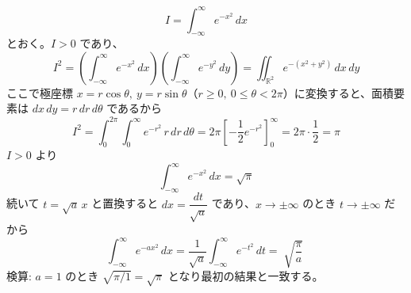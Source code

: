 
\[
I = \int_{-\infty}^{\infty} e^{-x^{2}}\, dx
\]
とおく。$I > 0$ であり、
\[
I^{2} = \left(\int_{-\infty}^{\infty} e^{-x^{2}}\, dx\right)\left(\int_{-\infty}^{\infty} e^{-y^{2}}\, dy\right)
= \iint_{\mathbb{R}^{2}} e^{-(x^{2}+y^{2})}\, dx\, dy
\]
ここで極座標 $x = r\cos\theta,\ y = r\sin\theta$（$r \ge 0,\ 0 \le \theta < 2\pi$）に変換すると、面積要素は $dx\,dy = r\, dr\, d\theta$ であるから
\[
I^{2} = \int_{0}^{2\pi}\!\! \int_{0}^{\infty} e^{-r^{2}}\, r\, dr\, d\theta
= 2\pi\left[-\frac{1}{2}e^{-r^{2}}\right]_{0}^{\infty}
= 2\pi \cdot \frac{1}{2} = \pi
\]
$I > 0$ より
\[
\boxed{\; \int_{-\infty}^{\infty} e^{-x^{2}}\, dx = \sqrt{\pi} \;}
\]
続いて $t = \sqrt{a}\, x$ と置換すると $dx = \dfrac{dt}{\sqrt{a}}$ であり、$x \to \pm\infty$ のとき $t \to \pm\infty$ だから
\[
\int_{-\infty}^{\infty} e^{-a x^{2}}\, dx = \frac{1}{\sqrt{a}} \int_{-\infty}^{\infty} e^{-t^{2}}\, dt = \boxed{\; \sqrt{\dfrac{\pi}{a}} \;}
\]
検算: $a=1$ のとき $\sqrt{\pi/1} = \sqrt{\pi}$ となり最初の結果と一致する。
